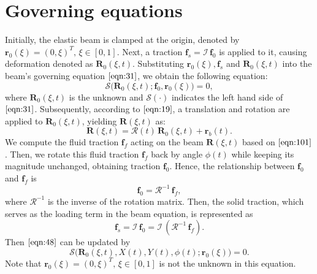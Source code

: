 \documentclass[a4paper,12pt]{report}
\begin{document}
\section{Governing equations}
Initially, the elastic beam is clamped at the origin, denoted by $\textbf{r}_0(\xi)=(0,\xi)^T,\,\xi\in [0,1]$. Next, a traction $\mathbf{f}_s=\mathcal{I}\,\textbf{f}_0$  is applied to it, causing deformation denoted as $\textbf{R}_0(\xi,t)$. Substituting 
$\textbf{r}_0(\xi), \textbf{f}_s$ and $\textbf{R}_0(\xi,t)$ into the beam's governing equation $\eqref{eqn:31}$, we obtain the following equation:
\begin{equation}
	\label{eqn:48}
	\bm{\mathcal{S}}\Big(\textbf{R}_0(\xi,t);\textbf{f}_0,\textbf{r}_0(\xi)\Big)=0,
\end{equation}
where $\textbf{R}_0(\xi,t)$ is the unknown and $\bm{\mathcal{S}}(\cdot)$ indicates the left hand side of $\eqref{eqn:31}$.
Subsequently, according to $\eqref{eqn:19}$, a translation and rotation are applied to 
$\textbf{R}_0(\xi,t)$, yielding $\textbf{R}(\xi,t)$ as:
\begin{equation}
	\label{eqn:49}
	\textbf{R}(\xi,t)=\bm{\mathcal{R}}(t)\,\textbf{R}_0(\xi,t)+\textbf{r}_b(t).
\end{equation}
 We compute the fluid traction $\textbf{f}_f$ acting on the beam $\textbf{R}(\xi,t)$ based on $\eqref{eqn:101}$. Then, we rotate this fluid traction $\textbf{f}_f$ back by angle $\phi(t)$ while keeping its magnitude unchanged, obtaining traction $\textbf{f}_0$. Hence, the relationship between $\textbf{f}_0$ and $\textbf{f}_f$ is 
\begin{equation}
	\label{eqn:50}
	\textbf{f}_0=\bm{\mathcal{R}}^{-1}\,\textbf{f}_f,
\end{equation}
where $\bm{\mathcal{R}}^{-1}$ is the inverse of the rotation matrix. Then, the solid traction, which serves as the loading term in the beam equation, is represented as 
\begin{equation}
	\label{eqn:67}
	\textbf{f}_s=\mathcal{I}\,\textbf{f}_0=\mathcal{I}\,\left(\bm{\mathcal{R}}^{-1}\,\textbf{f}_f\right).
\end{equation}
Then $\eqref{eqn:48}$ can be updated by
\begin{equation}
	\label{eqn:51}
	\bm{\mathcal{S}}\Big(\textbf{R}_0(\xi,t), X(t), Y(t),\phi(t);\textbf{r}_0(\xi)\Big)=0.
\end{equation}
Note that $\textbf{r}_0(\xi)=(0,\xi)^T,\,\xi\in [0,1]$ is not the unknown in this equation.
\end{document}
